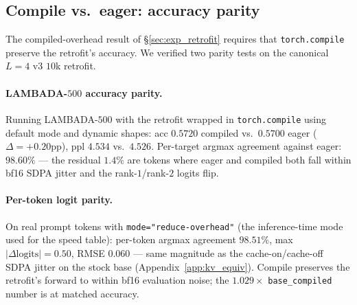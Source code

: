 \documentclass{article}
\begin{document}
\subsection{Compile vs.\ eager: accuracy parity}
\label{app:compile_accuracy}

The compiled-overhead result of \S\ref{sec:exp_retrofit} requires that \texttt{torch.compile} preserve the retrofit's accuracy. We verified two parity tests on the canonical $L{=}4$ v3 $10$k retrofit.

\paragraph{LAMBADA-$500$ accuracy parity.} Running LAMBADA-$500$ with the retrofit wrapped in \texttt{torch.compile} using default mode and dynamic shapes: acc $0.5720$ compiled vs.\ $0.5700$ eager ($\Delta{=}+0.20$pp), ppl $4.534$ vs.\ $4.526$. Per-target argmax agreement against eager: $98.60\%$ — the residual $1.4\%$ are tokens where eager and compiled both fall within bf16 SDPA jitter and the rank-$1$/rank-$2$ logits flip.

\paragraph{Per-token logit parity.} On real prompt tokens with \texttt{mode="reduce-overhead"} (the inference-time mode used for the speed table): per-token argmax agreement $98.51\%$, max $|\Delta\text{logits}|=0.50$, RMSE $0.060$ — same magnitude as the cache-on/cache-off SDPA jitter on the stock base (Appendix~\ref{app:kv_equiv}). Compile preserves the retrofit's forward to within bf16 evaluation noise; the $1.029\times$ \texttt{base\_compiled} number is at matched accuracy.
\end{document}
